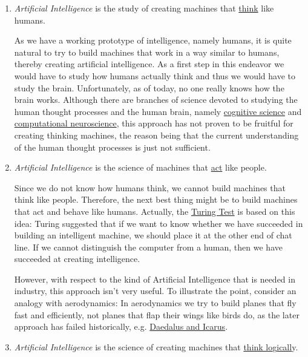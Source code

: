 \begin{enumerate}
\item \emph{Artificial Intelligence} is the study of creating machines that \underline{think} like humans.

      As we have a working prototype of intelligence, namely humans, it is quite natural to try to
      build machines that work in a way similar to humans, thereby creating artificial
      intelligence.  As a first step in this endeavor we would have to study how humans actually
      think and thus we would have to study the brain.  Unfortunately, as of today, no one really
      knows how the brain works.  Although there are branches of science devoted to studying the
      human thought processes and the human brain, namely
      \href{https://en.wikipedia.org/wiki/Cognitive_science}{cognitive science} and 
      \href{https://en.wikipedia.org/wiki/Computational_neuroscience}{computational neuroscience},
      this approach has not proven to be fruitful for creating thinking machines, the reason being
      that the current understanding of the human thought processes is just not sufficient.  

\item \emph{Artificial Intelligence} is the science of machines that \underline{act} like people.

      Since we do not know how humans think,  we cannot build machines that think like people.
      Therefore, the next best thing might be to build  machines that act and behave like humans.  
      Actually, the \href{https://en.wikipedia.org/wiki/Turing_test}{Turing Test} is based on this
      idea:  Turing suggested that if we want to know whether we have succeeded in building an
      intelligent machine, we should place it at the other end of chat line.  If we cannot
      distinguish the computer from a human, then we have succeeded at creating intelligence. 

      However, with respect to the kind of Artificial Intelligence that is needed in industry, this
      approach isn't very useful.  To illustrate the point, consider an analogy with aerodynamics:
      In aerodynamics we try to build planes that fly fast and efficiently, not planes that flap
      their wings like birds do, as the later approach has failed historically, e.g. 
      \href{https://en.wikipedia.org/wiki/Daedalus#Daedalus_and_Icarus}{Daedalus and Icarus}.
\item \emph{Artificial Intelligence} is the science of creating machines that \underline{think lo}g\underline{icall}y.


\end{enumerate}
